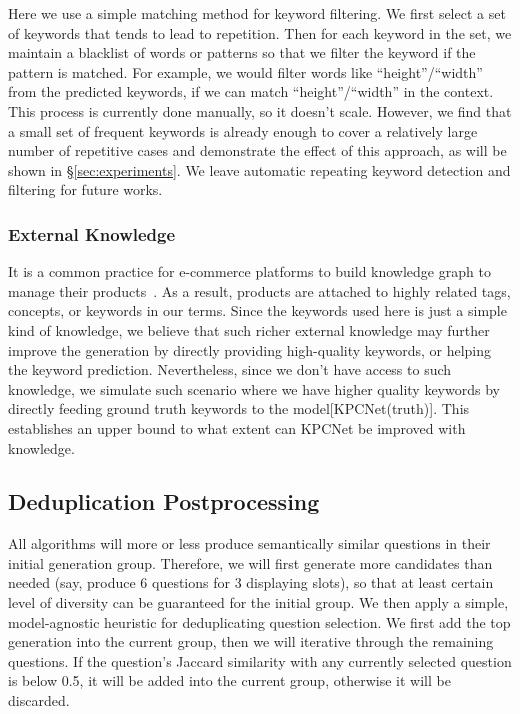 Here we use a simple matching method for keyword filtering. 
We first select a set of keywords that tends to lead to repetition. 
Then for each keyword in the set, we maintain a blacklist of words or 
patterns so that we filter the keyword if the pattern is matched. 
For example, we would filter words like ``height''/``width'' from the predicted keywords, if we can match ``height''/``width'' in the context. 
This process is currently done manually, so it doesn't scale. 
However, we find that a small set of frequent keywords is already 
enough to cover a relatively large number of repetitive cases and 
demonstrate the effect of this approach, as will be shown in \S \ref{sec:experiments}. 
We leave automatic repeating keyword detection and filtering for future works.  


\subsubsection{External Knowledge} \label{sec:knowledge}
It is a common practice for e-commerce platforms to build knowledge graph 
to manage their products~\citep{dong2018challenges, luo2020alicoco}. 
As a result, products are attached to highly related tags, concepts, 
or keywords in our terms. Since the keywords used here is just a simple kind of knowledge, we believe that such richer external knowledge may further improve the generation by directly providing high-quality keywords, or helping the keyword prediction. Nevertheless, since we don't have access to such knowledge, we simulate such scenario where we have higher quality keywords by directly feeding ground truth keywords to the model[KPCNet(truth)]. This establishes an upper bound to what extent can KPCNet be improved with knowledge.

\subsection{Deduplication Postprocessing}
\label{sec:deduplicate}
All algorithms will more or less produce semantically similar questions 
in their initial generation group. Therefore, we will first generate 
more candidates than needed (say, produce 6 questions for 3 displaying slots), 
so that at least certain level of diversity can be guaranteed for 
the initial group. We then apply a simple, model-agnostic heuristic for 
deduplicating question selection. We first add the top generation into 
the current group, then we will iterative through the remaining questions. 
If the question's Jaccard similarity with any currently selected question 
is below 0.5, it will be added into the current group, otherwise 
it will be discarded. 

